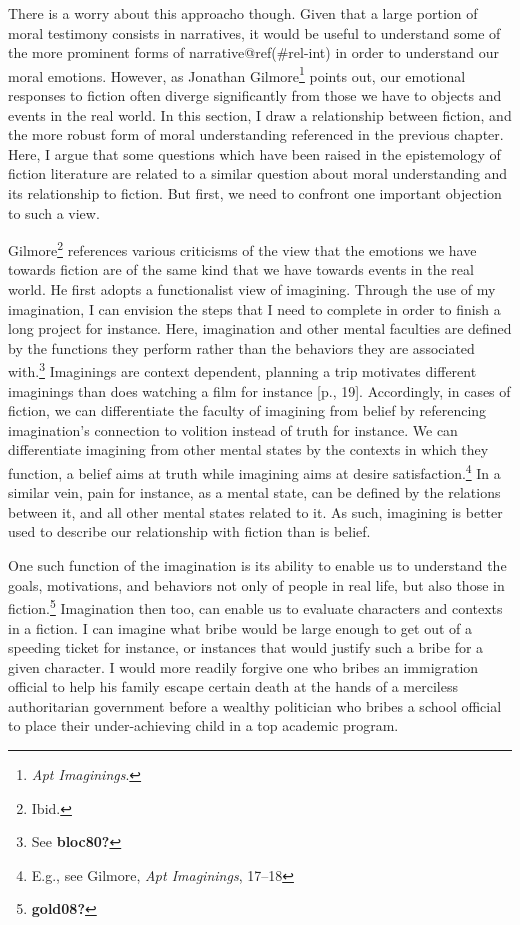 \documentclass[
  12pt,
]{book}
\theoremstyle{definition}
\theoremstyle{definition}
\theoremstyle{definition}
\theoremstyle{definition}
\theoremstyle{remark}
\begin{document}
There is a worry about this approacho though. Given that a large portion of moral testimony consists in narratives, it would be useful to understand some of the more prominent forms of narrative@ref(\#rel-int) in order to understand our moral emotions. However, as Jonathan Gilmore\footnote{\emph{Apt {Imaginings}}.} points out, our emotional responses to fiction often diverge significantly from those we have to objects and events in the real world. In this section, I draw a relationship between fiction, and the more robust form of moral understanding referenced in the previous chapter. Here, I argue that some questions which have been raised in the epistemology of fiction literature are related to a similar question about moral understanding and its relationship to fiction. But first, we need to confront one important objection to such a view.

Gilmore\footnote{Ibid.} references various criticisms of the view that the emotions we have towards fiction are of the same kind that we have towards events in the real world. He first adopts a functionalist view of imagining. Through the use of my imagination, I can envision the steps that I need to complete in order to finish a long project for instance. Here, imagination and other mental faculties are defined by the functions they perform rather than the behaviors they are associated with.\footnote{See \textbf{bloc80?}} Imaginings are context dependent, planning a trip motivates different imaginings than does watching a film for instance {[}p., 19{]}. Accordingly, in cases of fiction, we can differentiate the faculty of imagining from belief by referencing imagination's connection to volition instead of truth for instance. We can differentiate imagining from other mental states by the contexts in which they function, a belief aims at truth while imagining aims at desire satisfaction.\footnote{E.g., see Gilmore, \emph{Apt {Imaginings}}, 17--18} In a similar vein, pain for instance, as a mental state, can be defined by the relations between it, and all other mental states related to it. As such, imagining is better used to describe our relationship with fiction than is belief.

One such function of the imagination is its ability to enable us to understand the goals, motivations, and behaviors not only of people in real life, but also those in fiction.\footnote{\textbf{gold08?}} Imagination then too, can enable us to evaluate characters and contexts in a fiction. I can imagine what bribe would be large enough to get out of a speeding ticket for instance, or instances that would justify such a bribe for a given character. I would more readily forgive one who bribes an immigration official to help his family escape certain death at the hands of a merciless authoritarian government before a wealthy politician who bribes a school official to place their under-achieving child in a top academic program.
\end{document}
